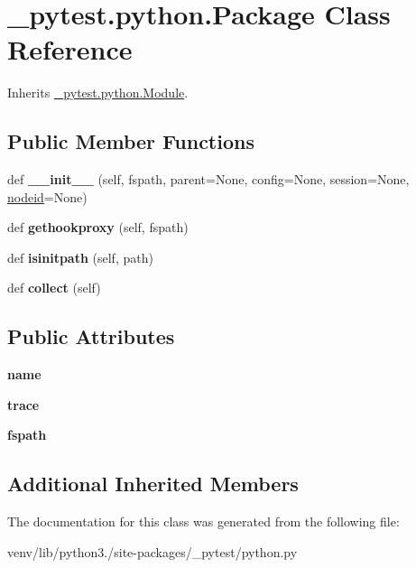 \hypertarget{class__pytest_1_1python_1_1_package}{}\section{\+\_\+pytest.\+python.\+Package Class Reference}
\label{class__pytest_1_1python_1_1_package}


Inherits \hyperlink{class__pytest_1_1python_1_1_module}{\+\_\+pytest.\+python.\+Module}.

\subsection*{Public Member Functions}
\begin{DoxyCompactItemize}
\item 
\mbox{\label{class__pytest_1_1python_1_1_package_a6f049da041f2b81db241356e1a43b29a}} 
def {\bfseries \+\_\+\+\_\+init\+\_\+\+\_\+} (self, fspath, parent=None, config=None, session=None, \hyperlink{class__pytest_1_1nodes_1_1_node_a02f18acbfaf1f9d8ba9b6c1346dc6217}{nodeid}=None)
\item 
\mbox{\label{class__pytest_1_1python_1_1_package_a8cbf1e67252d5d4828a5b60a61a3356c}} 
def {\bfseries gethookproxy} (self, fspath)
\item 
\mbox{\label{class__pytest_1_1python_1_1_package_abbf713ae4b9606bfe546d6b5913cd2a1}} 
def {\bfseries isinitpath} (self, path)
\item 
\mbox{\label{class__pytest_1_1python_1_1_package_ae3e3336fa3afd6fab538b4036821848b}} 
def {\bfseries collect} (self)
\end{DoxyCompactItemize}
\subsection*{Public Attributes}
\begin{DoxyCompactItemize}
\item 
\mbox{\label{class__pytest_1_1python_1_1_package_abf3b8b5778edfe6fe5b8c05833fd5824}} 
{\bfseries name}
\item 
\mbox{\label{class__pytest_1_1python_1_1_package_a1948628571b0c416e97f247a80e94f57}} 
{\bfseries trace}
\item 
\mbox{\label{class__pytest_1_1python_1_1_package_a6a6e83d4a07bc4d413213a32508b4b69}} 
{\bfseries fspath}
\end{DoxyCompactItemize}
\subsection*{Additional Inherited Members}


The documentation for this class was generated from the following file\+:\begin{DoxyCompactItemize}
\item 
venv/lib/python3./site-\/packages/\+\_\+pytest/python.\+py\end{DoxyCompactItemize}

